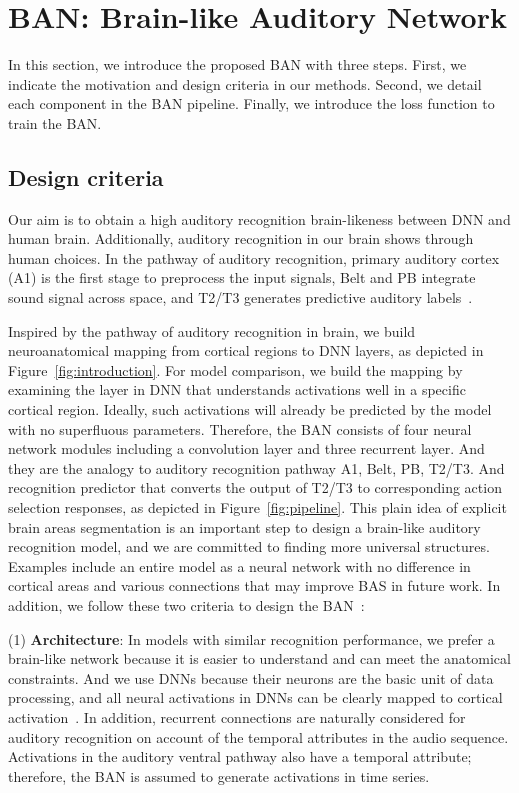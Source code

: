 \documentclass[journal]{IEEEtran}
\begin{document}
\section{BAN: Brain-like Auditory Network}
In this section, we introduce the proposed BAN with three steps. 
First, we indicate the motivation and design criteria in our methods.
Second, we detail each component in the BAN pipeline. 
Finally, we introduce the loss function to train the BAN. \par

\subsection{Design criteria}
Our aim is to obtain a high auditory recognition brain-likeness between DNN and human brain.
Additionally, auditory recognition in our brain shows through human choices. 
In the pathway of auditory recognition, primary auditory cortex (A1) is the first stage to preprocess the input signals, 
Belt and PB integrate sound signal across space,
and T2/T3 generates predictive auditory labels~\cite{b11,b13,b14}.
\par


Inspired by the pathway of auditory recognition in brain, we build neuroanatomical mapping from cortical regions to DNN layers, as depicted in Figure~\ref{fig:introduction}.
For model comparison, we build the mapping by examining the layer in DNN that understands activations well in a specific cortical region.
Ideally, such activations will already be predicted by the model with no superfluous parameters. 
Therefore, the BAN consists of four neural network modules including a convolution layer and three recurrent layer.
And they are the analogy to auditory recognition pathway A1, Belt, PB, T2/T3.
And recognition predictor that converts the output of T2/T3 to corresponding action selection responses, as depicted in Figure~\ref{fig:pipeline}. 
This plain idea of explicit brain areas segmentation is an important step to design a brain-like auditory recognition model, 
and we are committed to finding more universal structures. 
Examples include an entire model as a neural network with no difference in cortical areas
and various connections that may improve BAS in future work.
In addition, we follow these two criteria to design the BAN~\cite{kubilius2018predict}:

(1) \textbf{Architecture}: In models with similar recognition performance, we prefer a brain-like network because it is easier to understand and can meet the anatomical constraints.
And we use DNNs because their neurons are the basic unit of data processing, 
and all neural activations in DNNs can be clearly mapped to cortical activation~\cite{yamins2016using}.
In addition, recurrent connections are naturally considered for auditory recognition on account of the temporal attributes in the audio sequence.
Activations in the auditory ventral pathway also have a temporal attribute; 
therefore, the BAN is assumed to generate activations in time series.
\end{document}
